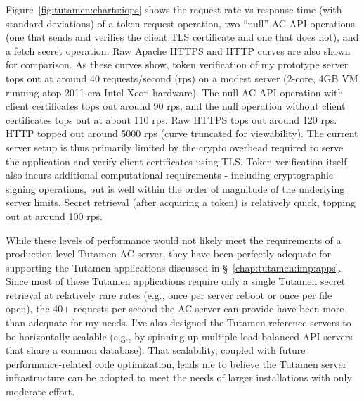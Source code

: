 Figure~\ref{fig:tutamen:charts:iops} shows the request rate vs
response time (with standard deviations) of a token request operation,
two ``null'' AC API operations (one that sends and verifies the client
TLS certificate and one that does not), and a fetch secret
operation. Raw Apache HTTPS and HTTP curves are also shown for
comparison. As these curves show, token verification of my prototype
server tops out at around 40 requests/second (rps) on a modest server
(2-core, 4GB VM running atop 2011-era Intel Xeon hardware). The null
AC API operation with client certificates tops out around 90 rps, and
the null operation without client certificates tops out at about 110
rps. Raw HTTPS tops out around 120 rps. HTTP topped out around 5000
rps (curve truncated for viewability). The current server setup is
thus primarily limited by the crypto overhead required to serve the
application and verify client certificates using TLS. Token
verification itself also incurs additional computational requirements
- including cryptographic signing operations, but is well within the
order of magnitude of the underlying server limits. Secret retrieval
(after acquiring a token) is relatively quick, topping out at around
100 rps.

While these levels of performance would not likely meet the
requirements of a production-level Tutamen AC server, they have been
perfectly adequate for supporting the Tutamen applications discussed
in \S~\ref{chap:tutamen:imp:apps}. Since most of these Tutamen
applications require only a single Tutamen secret retrieval at
relatively rare rates (e.g., once per server reboot or once per file
open), the 40+ requests per second the AC server can provide have been
more than adequate for my needs. I've also designed the Tutamen
reference servers to be horizontally scalable (e.g., by spinning up
multiple load-balanced API servers that share a common database). That
scalability, coupled with future performance-related code
optimization, leads me to believe the Tutamen server infrastructure
can be adopted to meet the needs of larger installations with only
moderate effort.

